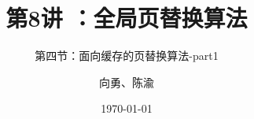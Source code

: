 



\title[第8讲]{第8讲 ：全局页替换算法} %
\subtitle{第四节：面向缓存的页替换算法-part1}
\author{向勇、陈渝} %
\date{\today} %




\begin{frame}
\titlepage %
\end{frame}

%

